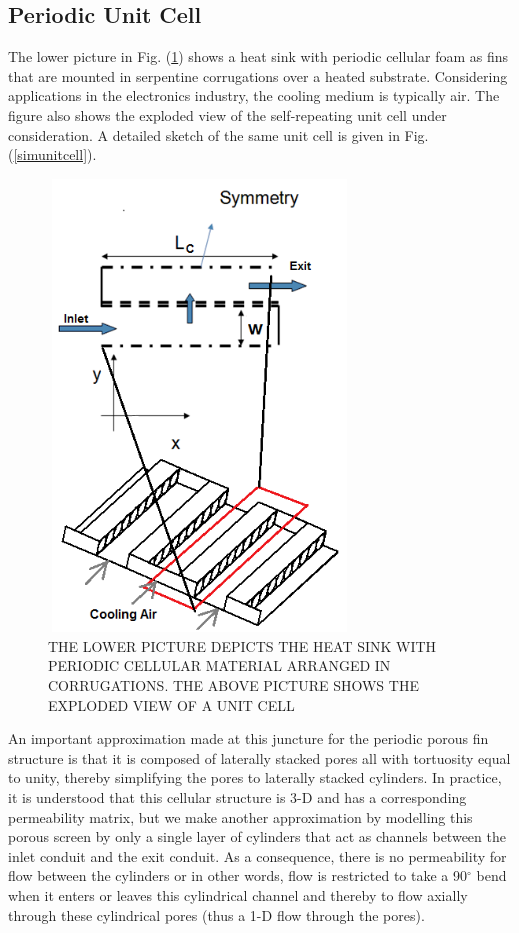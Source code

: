 \documentclass[twocolumn,10pt,cleanfoot]{ihmtc}
\begin{document}
\subsection{Periodic Unit Cell}\label{periodicunitcell}
The lower picture in Fig. (\ref{exploded}) shows a heat sink with periodic cellular foam as fins that are mounted in serpentine corrugations over a heated substrate. Considering applications in the electronics industry, the cooling medium is typically air. The figure also shows the exploded view of the self-repeating unit cell under consideration. A detailed sketch of the same unit cell is given in Fig. (\ref{simunitcell}).
%
\begin{figure}[ht]
\centerline{\includegraphics[width=80mm,height=120mm]{exploded_2.png}}
\vspace{-1.5ex}
\caption{\small{THE LOWER PICTURE DEPICTS THE HEAT SINK WITH PERIODIC CELLULAR MATERIAL ARRANGED IN CORRUGATIONS. THE ABOVE PICTURE SHOWS THE EXPLODED VIEW OF A UNIT CELL}}
\label{exploded}
\end{figure}
%
An important approximation made at this juncture for the periodic porous fin structure is that it is composed of laterally stacked pores all with tortuosity equal to unity, thereby simplifying the pores to laterally stacked cylinders. In practice, it is understood that this cellular structure is 3-D and has a corresponding permeability matrix, but we make another approximation by modelling this porous screen by only a single layer of cylinders that act as channels between the inlet conduit and the exit conduit. As a consequence, there is no permeability for flow between the cylinders or in other words, flow is restricted to take a 90$^\circ$ bend when it enters or leaves this cylindrical channel and thereby to flow axially through these cylindrical pores (thus a 1-D flow through the pores).
\end{document}
